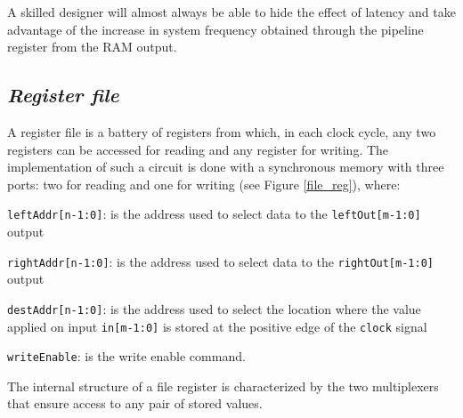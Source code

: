 A skilled designer will almost always be able to hide the effect of latency and take advantage of the increase in system frequency obtained through the pipeline register from the RAM output.


\subsection{{\bf {\em Register file}}}\label{registerFile}


A register file is a battery of registers from which, in each clock cycle, any two registers can be accessed for reading and any register for writing. The implementation of such a circuit is done with a synchronous memory with three ports: two for reading and one for writing (see Figure \ref{file_reg}), where:


\begin{description}
    \item{{\tt leftAddr[n-1:0]}}: is the address used to select data to the {\tt leftOut[m-1:0]} output
    \item{{\tt rightAddr[n-1:0]}}: is the address used to select data to the {\tt rightOut[m-1:0]} output
    \item{{\tt destAddr[n-1:0]}}: is the address used to select the location where the value applied on input {\tt in[m-1:0]} is stored at the positive edge of the {\tt clock} signal
    \item{{\tt writeEnable}}: is the write enable command.
\end{description}
The internal structure of a file register is characterized by the two multiplexers that ensure access to any pair of stored values.


